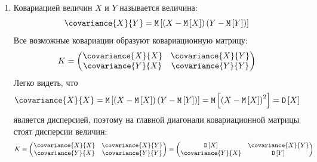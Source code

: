 \documentclass[12pt,a4paper]{article}
\begin{document}
\begin{enumerate}
        \item Ковариацией величин $X$ и $Y$ называется величина:
        \begin{equation}
            \covariance{X}{Y} = \expectation{\left ( X - \expectation{X} \right ) \left ( Y - \expectation{Y} \right )}
        \end{equation}
        Все возможные ковариации образуют ковариационную матрицу:
        \begin{equation}
            K =
            \begin{pmatrix}
                \covariance{X}{X} & \covariance{X}{Y} \\
                \covariance{Y}{X} & \covariance{Y}{Y}
            \end{pmatrix}
        \end{equation}
        Легко видеть, что
        \begin{equation}
            \covariance{X}{X}
            = \expectation{\left ( X - \expectation{X} \right ) \left ( Y - \expectation{Y} \right )}
            = \expectation{\left ( X - \expectation{X} \right )^2}
            = \variance{X}
        \end{equation}
        является дисперсией, поэтому на главной диагонали ковариационной матрицы стоят дисперсии величин:
        \begin{equation}
            K =
            \begin{pmatrix}
                \covariance{X}{X} & \covariance{X}{Y} \\
                \covariance{Y}{X} & \covariance{Y}{Y}
            \end{pmatrix}
            =
            \begin{pmatrix}
                \variance{X}      & \covariance{X}{Y} \\
                \covariance{Y}{X} & \variance{Y}
            \end{pmatrix}
        \end{equation}


\end{enumerate}
\end{document}
